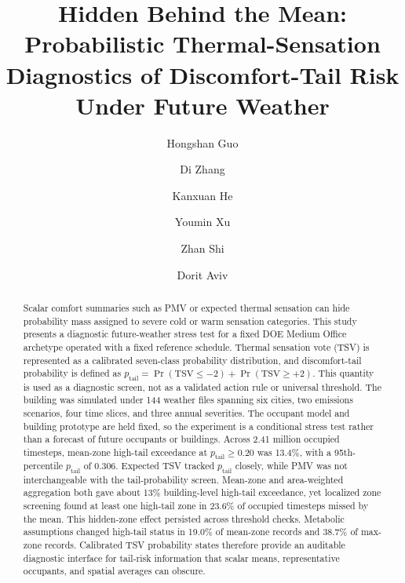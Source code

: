 \documentclass[preprint,3p,12pt]{elsarticle}
\begin{document}
\begin{frontmatter}

\title{Hidden Behind the Mean: Probabilistic Thermal-Sensation Diagnostics of Discomfort-Tail Risk Under Future Weather}

\author[inst1]{Hongshan Guo}
\author[inst1]{Di Zhang}
\author[inst1]{Kanxuan He}
\author[kansas]{Youmin Xu}
\author[inst2]{Zhan Shi}
\author[inst2]{Dorit Aviv}




\begin{abstract}
Scalar comfort summaries such as PMV or expected thermal sensation can hide probability mass assigned to severe cold or warm sensation categories. This study presents a diagnostic future-weather stress test for a fixed DOE Medium Office archetype operated with a fixed reference schedule. Thermal sensation vote (TSV) is represented as a calibrated seven-class probability distribution, and discomfort-tail probability is defined as $p_{\mathrm{tail}}=\Pr(\mathrm{TSV}\le -2)+\Pr(\mathrm{TSV}\ge +2)$. This quantity is used as a diagnostic screen, not as a validated action rule or universal threshold. The building was simulated under 144 weather files spanning six cities, two emissions scenarios, four time slices, and three annual severities. The occupant model and building prototype are held fixed, so the experiment is a conditional stress test rather than a forecast of future occupants or buildings. Across 2.41 million occupied timesteps, mean-zone high-tail exceedance at $p_{\mathrm{tail}}\ge0.20$ was 13.4\%, with a 95th-percentile $p_{\mathrm{tail}}$ of 0.306. Expected TSV tracked $p_{\mathrm{tail}}$ closely, while PMV was not interchangeable with the tail-probability screen. Mean-zone and area-weighted aggregation both gave about 13\% building-level high-tail exceedance, yet localized zone screening found at least one high-tail zone in 23.6\% of occupied timesteps missed by the mean. This hidden-zone effect persisted across threshold checks. Metabolic assumptions changed high-tail status in 19.0\% of mean-zone records and 38.7\% of max-zone records. Calibrated TSV probability states therefore provide an auditable diagnostic interface for tail-risk information that scalar means, representative occupants, and spatial averages can obscure.
\end{abstract}


\end{frontmatter}
\end{document}
